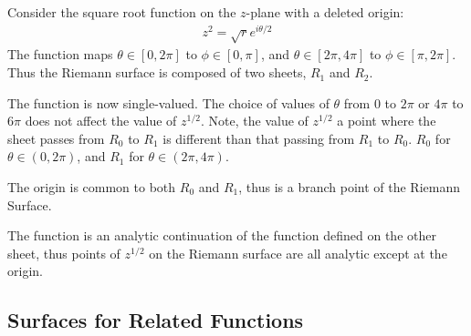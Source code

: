 \documentclass[12pt, english]{book}
\begin{document}
	\begin{example}
		Consider the square root function on the \(z\)-plane with a deleted origin:
		\begin{align*}
			z^2 = \sqrt{r}e^{i\theta/2}
		\end{align*}
		The function maps \(\theta \in [0, 2\pi]\) to \(\phi \in [0, \pi]\), and \(\theta \in [2\pi, 4\pi]\) to \(\phi \in [\pi, 2\pi]\). Thus the Riemann surface is composed of two sheets, \(R_1\) and \(R_2\).
		
		\begin{figure}[H]
			\centering
		\end{figure}
	
		The function is now single-valued. The choice of values of \(\theta\) from \(0\) to \(2\pi\) or \(4\pi\) to \(6\pi\) does not affect the value of \(z^{1/2}\). Note, the value of \(z^{1/2}\) a point where the sheet passes from \(R_0\) to \(R_1\) is different than that passing from \(R_1\) to \(R_0\). \(R_0\) for \(\theta \in (0, 2\pi)\), and \(R_1\) for \(\theta \in (2\pi, 4\pi)\).
		
		The origin is common to both \(R_0\) and \(R_1\), thus is a branch point of the Riemann Surface.
		
		The function is an analytic continuation of the function defined on the other sheet, thus points of \(z^{1/2}\) on the Riemann surface are all analytic except at the origin.
	\end{example}

	
	\subsection{Surfaces for Related Functions} \label{Surfaces for Related Functions Subsection - Complex}
	
\end{document}
